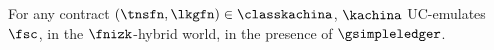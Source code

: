 \begin{theorem}
  For any contract $(\tnsfn, \lkgfn) \in \classkachina$, $\kachina$ UC-emulates
  $\fsc$, in the $\fnizk$-hybrid world, in the presence of
  $\gsimpleledger$.
  \label{thm:kachina}
\end{theorem}

